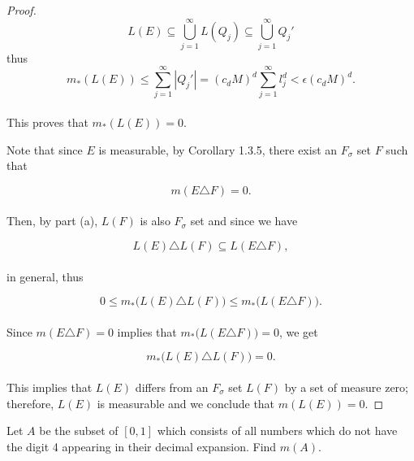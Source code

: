 \documentclass[12pt, a4paper, openany, twoside]{book}
\theoremstyle{definition}
\theoremstyle{remark}
\theoremstyle{plain}
\numberwithin{equation}{section}
\begin{document}
\begin{proof}
    \[L(E)\subseteq\bigcup_{j=1}^{\infty}{L(Q_j)}\subseteq\bigcup_{j=1}^{\infty}{Q_j'}\]
    thus 
    \[m_*(L(E))\leq\sum_{j=1}^{\infty}{|Q_j'|}=(c_dM)^d\sum_{j=1}^{\infty}{l_j^d}<\epsilon(c_dM)^d.\]
    \\
    This proves that $m_*(L(E))=0$. 

    Note that since $E$ is measurable, by Corollary 1.3.5, there exist an $F_\sigma$ set $F$ such that 
    
    \[m(E\triangle F)=0.\]
    \\
    Then, by part (a), $L(F)$ is also $F_\sigma$ set and since we have

    \[L(E)\triangle L(F)\subseteq L(E\triangle F),\]
    \\
    in general, thus 

    \[0\leq m_*\big(L(E)\triangle L(F)\big)\leq m_*\big(L(E\triangle F)\big).\]
    \\
    Since $m(E\triangle F)=0$ implies that $m_*\big(L(E\triangle F)\big)=0$, we get 

    \[m_*\big(L(E)\triangle L(F)\big)=0.\]
    \\
    This implies that $L(E)$ differs from an $F_\sigma$ set $L(F)$ by a set of measure zero; therefore, $L(E)$ is measurable and we conclude that $m(L(E))=0$.
\end{proof}

\newpage

\begin{tcolorbox}[colback=yellow!10!white,colframe=gray!75!black,title=Exercise 1.11]\label{Exercise 1.11}
    Let $A$ be the subset of $[0,1]$ which consists of all numbers which do not have the digit 4 appearing in their decimal expansion. Find $m(A)$.
\end{tcolorbox}
\end{document}
